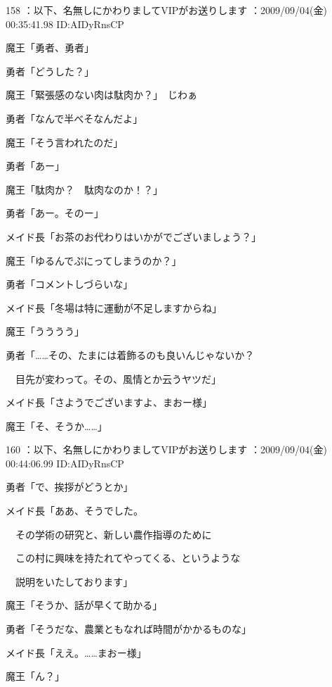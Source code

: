 \documentclass[a4j,twocolumn]{tarticle}
\begin{document}
158 ：以下、名無しにかわりましてVIPがお送りします ：2009/09/04(金) 00:35:41.98 ID:AIDyRnsCP 


魔王「勇者、勇者」\par{} 
勇者「どうした？」 



魔王「緊張感のない肉は駄肉か？」　じわぁ\par{} 
勇者「なんで半べそなんだよ」\par{} 
魔王「そう言われたのだ」\par{} 
勇者「あー」 



魔王「駄肉か？　駄肉なのか！？」\par{} 
勇者「あー。そのー」\par{} 
メイド長「お茶のお代わりはいかがでございましょう？」 



魔王「ゆるんでぷにってしまうのか？」\par{} 
勇者「コメントしづらいな」\par{} 
メイド長「冬場は特に運動が不足しますからね」\par{} 
魔王「うううう」 



勇者「……その、たまには着飾るのも良いんじゃないか？\par{} 
　目先が変わって。その、風情とか云うヤツだ」\par{} 
メイド長「さようでございますよ、まおー様」 



魔王「そ、そうか……」 

	
    
    

160 ：以下、名無しにかわりましてVIPがお送りします ：2009/09/04(金) 00:44:06.99 ID:AIDyRnsCP 


勇者「で、挨拶がどうとか」\par{} 
メイド長「ああ、そうでした。\par{} 
　その学術の研究と、新しい農作指導のために\par{} 
　この村に興味を持たれてやってくる、というような\par{} 
　説明をいたしております」 



魔王「そうか、話が早くて助かる」\par{} 
勇者「そうだな、農業ともなれば時間がかかるものな」 



メイド長「ええ。……まおー様」\par{} 
魔王「ん？」 
\end{document}
